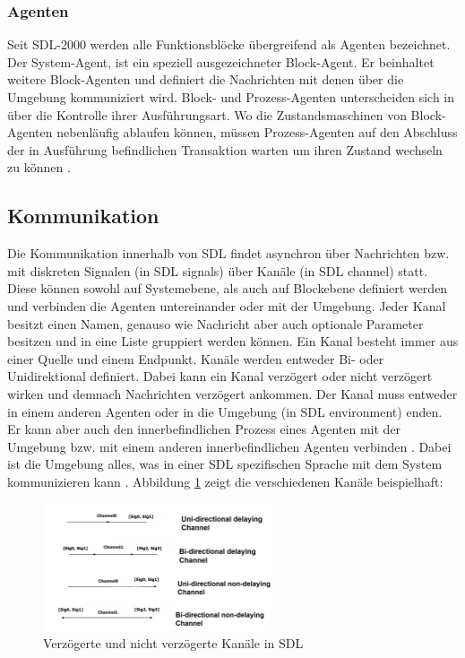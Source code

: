 \subsubsection{Agenten}
Seit \ac{SDL}-2000 werden alle Funktionsblöcke übergreifend als Agenten bezeichnet. Der System-Agent, ist ein speziell ausgezeichneter Block-Agent. Er beinhaltet weitere Block-Agenten und definiert die Nachrichten mit denen über die Umgebung kommuniziert wird. Block- und Prozess-Agenten unterscheiden sich in über die Kontrolle ihrer Ausführungsart. Wo die Zustandsmaschinen von Block-Agenten nebenläufig ablaufen können, müssen Prozess-Agenten auf den Abschluss der in Ausführung befindlichen Transaktion warten um ihren Zustand wechseln zu können \cite[29\psq]{ITUT101_2016}.


\subsection{Kommunikation}
\label{ssc:Kommunikation}
Die Kommunikation innerhalb von \ac{SDL} findet asynchron über Nachrichten bzw. mit diskreten Signalen (in \ac{SDL} signals) über Kanäle (in \ac{SDL} channel) statt. 
Diese können sowohl auf Systemebene, als auch auf Blockebene definiert werden und verbinden die Agenten untereinander oder mit der Umgebung.
Jeder Kanal besitzt einen Namen, genauso wie Nachricht aber auch optionale Parameter besitzen und in eine Liste gruppiert werden können.
Ein Kanal besteht immer aus einer Quelle und einem Endpunkt. Kanäle werden entweder Bi- oder Unidirektional definiert. Dabei kann ein Kanal verzögert oder nicht verzögert wirken und demnach Nachrichten verzögert ankommen. Der Kanal muss entweder in einem anderen Agenten oder in die Umgebung (in \ac{SDL} environment) enden. Er kann aber auch den innerbefindlichen Prozess eines Agenten mit der Umgebung bzw. mit einem anderen innerbefindlichen Agenten verbinden \cite[39-42]{ITUT101_2016}. Dabei ist die Umgebung alles, was in einer \ac{SDL} spezifischen Sprache mit dem System kommunizieren kann \cite[3\psq]{ITUT100_2016}.
Abbildung \ref{fig:KommModell} zeigt die verschiedenen Kanäle beispielhaft:
 
\begin{figure}[h]
	\centering
	\includegraphics[width=0.6\textwidth]{Graphics/Channel.png}
	\caption{Verzögerte und nicht verzögerte Kanäle in SDL}
	\label{fig:KommModell}
\end{figure}

